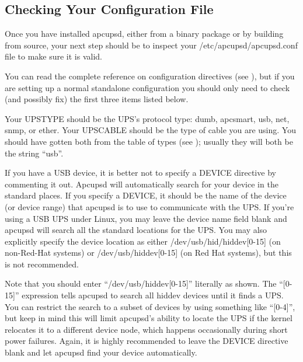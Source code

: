 \label{index-After-Installation-57}
\label{index-Installation_002c-After-installing-58}

\label{Checking-Your-Configuration-File}

\subsection*{Checking Your Configuration File}

\label{index-Checking-Conf-file-59}
Once you have installed apcupsd, either from a binary package or by building
from source, your next step should be to inspect your
/etc/apcupsd/apcupsd.conf file to make sure it is valid.  

You can read the complete reference on configuration directives (see 
), but if you are
setting up a normal standalone configuration you should only need to check
(and possibly fix) the first three items listed below.  

Your UPSTYPE should be the UPS's protocol type: dumb, apcsmart, usb, net,
snmp, or ether.  Your UPSCABLE should be the type of cable you are using.  You
should have gotten both from the table of types (see 
); usually they will both be the
string ``usb''.  

If you have a USB device, it is better not to specify a DEVICE directive by
commenting it out. Apcupsd will automatically search for your device in the
standard places. If you specify a DEVICE, it should be the name of the device
(or device range) that apcupsd is to use to communicate with the UPS.  If
you're using a USB UPS under Linux, you may leave the device name field blank
and apcupsd will search all the standard locations for the UPS. You may also
explicitly specify the device location as either /dev/usb/hid/hiddev[0-15] (on
non-Red-Hat systems) or /dev/usb/hiddev[0-15] (on Red Hat systems), but this
is not recommended.  

Note that you should enter ``/dev/usb/hiddev[0-15]'' literally as shown.  The
``[0-15]'' expression tells apcupsd to search all hiddev devices until it
finds a UPS. You can restrict the search to a subset of devices by using
something like ``[0-4]'', but keep in mind this will limit apcupsd's ability
to locate the UPS if the kernel relocates it to a different device node, which
happens occasionally during short power failures. Again, it is highly
recommended to leave the DEVICE directive blank and let apcupsd find your
device automatically.  


